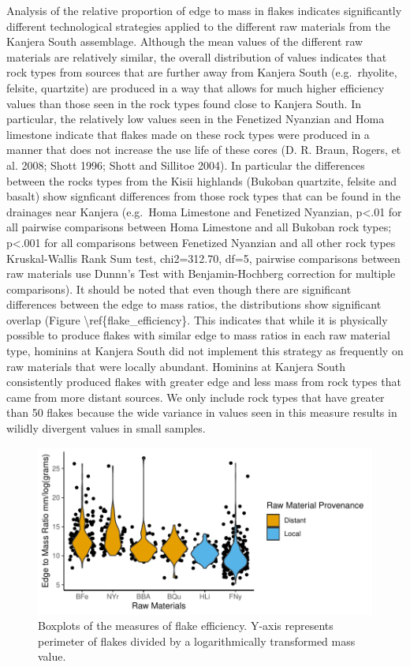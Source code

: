\documentclass[]{elsarticle} %
\makeatletter
\def\maxwidth{\ifdim\Gin@nat@width>\linewidth\linewidth
\else\Gin@nat@width\fi}
\let\Oldincludegraphics\includegraphics
\renewcommand{\includegraphics}[1]{\Oldincludegraphics[width=\maxwidth]{#1}}
\makeatother
\begin{document}
Analysis of the relative proportion of edge to mass in flakes indicates
significantly different technological strategies applied to the
different raw materials from the Kanjera South assemblage. Although the
mean values of the different raw materials are relatively similar, the
overall distribution of values indicates that rock types from sources
that are further away from Kanjera South (e.g.~rhyolite, felsite,
quartzite) are produced in a way that allows for much higher efficiency
values than those seen in the rock types found close to Kanjera South.
In particular, the relatively low values seen in the Fenetized Nyanzian
and Homa limestone indicate that flakes made on these rock types were
produced in a manner that does not increase the use life of these cores
(D. R. Braun, Rogers, et al. 2008; Shott 1996; Shott and Sillitoe 2004).
In particular the differences between the rocks types from the Kisii
highlands (Bukoban quartzite, felsite and basalt) show signficant
differences from those rock types that can be found in the drainages
near Kanjera (e.g.~Homa Limestone and Fenetized Nyanzian,
p\textless{}.01 for all pairwise comparisons between Homa Limestone and
all Bukoban rock types; p\textless{}.001 for all comparisons between
Fenetized Nyanzian and all other rock types Kruskal-Wallis Rank Sum
test, chi2=312.70, df=5, pairwise comparisons between raw materials use
Dunnn's Test with Benjamin-Hochberg correction for multiple
comparisons). It should be noted that even though there are significant
differences between the edge to mass ratios, the distributions show
significant overlap (Figure \textbackslash{}ref\{flake\_efficiency\}.
This indicates that while it is physically possible to produce flakes
with similar edge to mass ratios in each raw material type, hominins at
Kanjera South did not implement this strategy as frequently on raw
materials that were locally abundant. Hominins at Kanjera South
consistently produced flakes with greater edge and less mass from rock
types that came from more distant sources. We only include rock types
that have greater than 50 flakes because the wide variance in values
seen in this measure results in wilidly divergent values in small
samples.

\begin{figure}
\centering
\includegraphics{Reeves_Braun_et_al_2020_Kanjera_South_JHE_files/figure-latex/fig-7-1.pdf}
\caption{Boxplots of the measures of flake efficiency. Y-axis represents
perimeter of flakes divided by a logarithmically transformed mass value.
\label{flake_efficiency}}
\end{figure}
\end{document}
